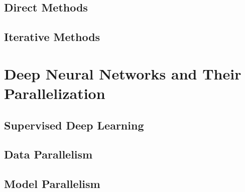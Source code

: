 \subsection{Direct Methods}
\subsection{Iterative Methods}

\section{Deep Neural Networks and Their Parallelization}
\subsection{Supervised Deep Learning}
\subsection{Data Parallelism}
\subsection{Model Parallelism}
